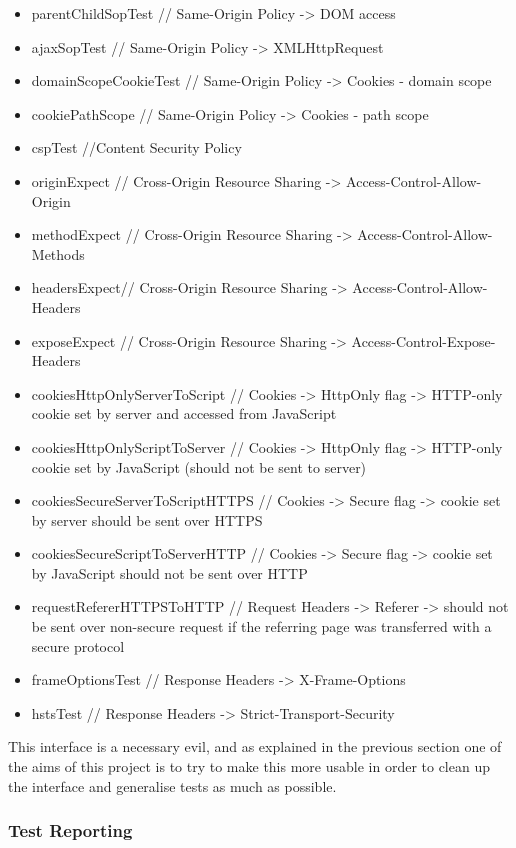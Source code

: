 \begin{itemize}
 \item parentChildSopTest // Same-Origin Policy -> DOM access
 \item ajaxSopTest // Same-Origin Policy -> XMLHttpRequest
 \item domainScopeCookieTest // Same-Origin Policy -> Cookies - domain scope
 \item cookiePathScope // Same-Origin Policy -> Cookies - path scope
 \item cspTest //Content Security Policy
 \item originExpect // Cross-Origin Resource Sharing -> Access-Control-Allow-Origin  
 \item methodExpect // Cross-Origin Resource Sharing -> Access-Control-Allow-Methods
 \item headersExpect// Cross-Origin Resource Sharing -> Access-Control-Allow-Headers
 \item exposeExpect // Cross-Origin Resource Sharing -> Access-Control-Expose-Headers
 \item cookiesHttpOnlyServerToScript // Cookies -> HttpOnly flag -> HTTP-only cookie set by server and accessed from JavaScript
 \item cookiesHttpOnlyScriptToServer  // Cookies -> HttpOnly flag -> HTTP-only cookie set by JavaScript (should not be sent to server)
 \item cookiesSecureServerToScriptHTTPS // Cookies -> Secure flag -> cookie set by server should be sent over HTTPS
 \item cookiesSecureScriptToServerHTTP // Cookies -> Secure flag -> cookie set by JavaScript should not be sent over HTTP
 \item requestRefererHTTPSToHTTP // Request Headers -> Referer -> should not be sent over non-secure request if the referring page was transferred with a secure protocol
 \item frameOptionsTest // Response Headers -> X-Frame-Options
 \item hstsTest // Response Headers -> Strict-Transport-Security
\end{itemize}

This interface is a necessary evil, and as explained in the previous section one of the aims of this project is to try to make this
more usable in order to clean up the interface and generalise tests as much as possible.


\subsubsection{Test Reporting}
\label{subsec:reporter}

